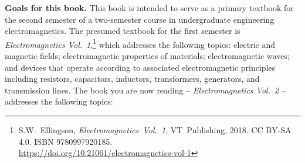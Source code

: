 

\label{m0213_Preface-About_This_Book_v2} %

{\bf Goals for this book.}
This book is intended to serve as a primary textbook for the second semester of a two-semester course in undergraduate engineering electromagnetics.
The presumed textbook for the first semester is \emph{Electromagnetics Vol.~1},\footnote{S.W.~Ellingson, 
\emph{Electromagnetics~Vol.~1}, 
VT~Publishing, 2018. CC BY-SA 4.0. ISBN 9780997920185.\\ 
\url{https://doi.org/10.21061/electromagnetics-vol-1}} 
which addresses the following topics: 
electric and magnetic fields; 
electromagnetic properties of materials;
electromagnetic waves;
and devices that operate according to associated electromagnetic principles including 
resistors, 
capacitors, 
inductors, 
transformers, 
generators,
and
transmission lines.
The book you are now reading -- \emph{Electromagnetics Vol.~2} -- addresses the following topics:
%
